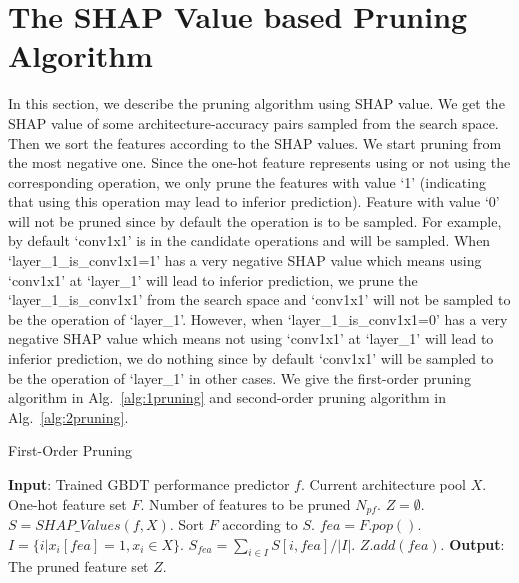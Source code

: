 \documentclass{article}
\begin{document}
\setcounter{section}{0}

\section{The SHAP Value based Pruning Algorithm}
In this section, we describe the pruning algorithm using SHAP value. We get the SHAP value of some architecture-accuracy pairs sampled from the search space. Then we sort the features according to the SHAP values. We start pruning from the most negative one. Since the one-hot feature represents using or not using the corresponding operation, we only prune the features with value `1' (indicating that using this operation may lead to inferior prediction). Feature with value `0' will not be pruned since by default the operation is to be sampled. For example, by default `conv1x1' is in the candidate operations and will be sampled. When `layer\_1\_is\_conv1x1=1' has a very negative SHAP value which means using `conv1x1' at `layer\_1' will lead to inferior prediction, we prune the `layer\_1\_is\_conv1x1' from the search space and `conv1x1' will not be sampled to be the operation of `layer\_1'. However, when `layer\_1\_is\_conv1x1=0' has a very negative SHAP value which means not using `conv1x1' at `layer\_1' will lead to inferior prediction, we do nothing since by default `conv1x1' will be sampled to be the operation of `layer\_1' in other cases. We give the first-order pruning algorithm in Alg.~\ref{alg:1pruning} and second-order pruning algorithm in Alg.~\ref{alg:2pruning}.

\begin{algorithm}[ht]
\small
\caption{First-Order Pruning}
\label{alg:1pruning}
\begin{algorithmic}[1]
\STATE \textbf{Input}: Trained GBDT performance predictor $f$. Current architecture pool $X$. One-hot feature set $F$. Number of features to be pruned $N_{pf}$.
\STATE $Z=\emptyset$.
\STATE $S = SHAP\_Values(f, X)$.
\STATE Sort $F$ according to $S$.
\STATE $fea=F.pop()$.
\STATE $I = \{i|x_i[fea] = 1, x_i \in X\}$.
\STATE $S_{fea} = \sum_{i\in I}S[i,fea] / |I|$.
\STATE $Z.add(fea)$.
\ENDIF
\ENDFOR
\STATE \textbf{Output}: The pruned feature set $Z$.
\end{algorithmic}
\end{algorithm}
\end{document}

